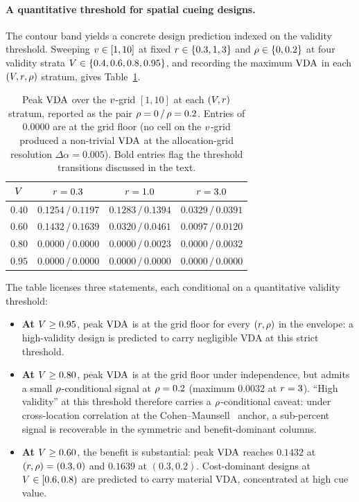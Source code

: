 \paragraph{A quantitative threshold for spatial cueing designs.}
The contour band yields a concrete design prediction indexed on the
validity threshold. Sweeping $v \in [1, 10]$ at fixed $r \in
\{0.3, 1, 3\}$ and $\rho \in \{0, 0.2\}$ at four validity strata
$V \in \{0.4, 0.6, 0.8, 0.95\}$, and recording the maximum $\mathrm{VDA}$
in each $(V, r, \rho)$ stratum, gives
Table~\ref{tab:graded-highV}.
%
\begin{table}[t]
  \centering
  \small
  \begin{tabular}{c c c c}
    \toprule
    $V$ & $r = 0.3$ & $r = 1.0$ & $r = 3.0$ \\
    \midrule
    $0.40$  & $0.1254\,/\,0.1197$ & $0.1283\,/\,0.1394$ & $0.0329\,/\,0.0391$\\
    $0.60$  & $0.1432\,/\,\mathbf{0.1639}$ & $0.0320\,/\,0.0461$ & $0.0097\,/\,0.0120$\\
    $0.80$  & $0.0000\,/\,0.0000$ & $0.0000\,/\,\mathbf{0.0023}$ & $0.0000\,/\,\mathbf{0.0032}$\\
    $0.95$  & $0.0000\,/\,0.0000$ & $0.0000\,/\,0.0000$ & $0.0000\,/\,0.0000$\\
    \bottomrule
  \end{tabular}
  \caption{Peak $\mathrm{VDA}$ over the $v$-grid $[1, 10]$ at each $(V,
  r)$ stratum, reported as the pair $\rho = 0\,/\,\rho = 0.2$.
  Entries of $0.0000$ are at the grid floor (no cell on the $v$-grid
  produced a non-trivial $\mathrm{VDA}$ at the allocation-grid resolution
  $\Delta\alpha = 0.005$). Bold entries flag the threshold transitions
  discussed in the text.}
  \label{tab:graded-highV}
\end{table}
%
The table licenses three statements, each conditional on a quantitative
validity threshold:
\begin{itemize}
  \item \textbf{At $V \ge 0.95$}, peak $\mathrm{VDA}$ is at the grid floor
        for every $(r, \rho)$ in the envelope: a high-validity
        design is predicted to carry negligible VDA at this strict
        threshold.
  \item \textbf{At $V \ge 0.80$}, peak $\mathrm{VDA}$ is at the grid floor
        under independence, but admits a small $\rho$-conditional
        signal at $\rho = 0.2$ (maximum $0.0032$ at $r = 3$).
        ``High validity'' at this threshold therefore carries a
        $\rho$-conditional caveat: under cross-location correlation at
        the Cohen--Maunsell~\cite{CohenMaunsell2009} anchor, a
        sub-percent signal is recoverable in the symmetric and
        benefit-dominant columns.
  \item \textbf{At $V \ge 0.60$}, the benefit is substantial: peak
        $\mathrm{VDA}$ reaches $0.1432$ at $(r, \rho) = (0.3, 0)$ and
        $0.1639$ at $(0.3, 0.2)$. Cost-dominant designs at $V \in
        [0.6, 0.8)$ are predicted to carry material VDA, concentrated at
        high cue value.
\end{itemize}
